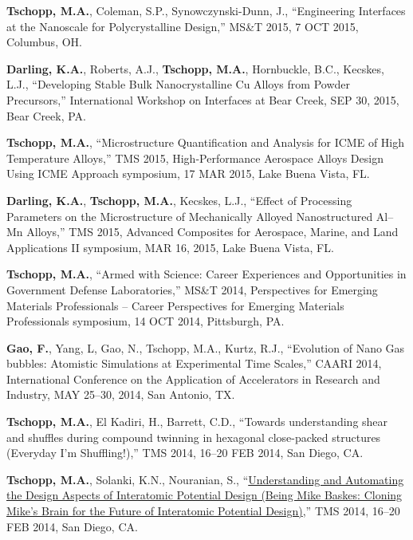 \begin{cvlist}
\item
\textbf{Tschopp, M.A.}, Coleman, S.P., Synowczynski-Dunn, J., ``Engineering Interfaces at the Nanoscale for Polycrystalline Design,'' MS\&T 2015, 7 OCT 2015, Columbus, OH.

\item
\textbf{Darling, K.A.}, Roberts, A.J., \textbf{Tschopp, M.A.}, Hornbuckle, B.C., Kecskes, L.J., ``Developing Stable Bulk Nanocrystalline Cu Alloys from Powder Precursors,'' International Workshop on Interfaces at Bear Creek, SEP 30, 2015, Bear Creek, PA.

\item
\textbf{Tschopp, M.A.}, ``Microstructure Quantification and Analysis for ICME of High Temperature Alloys,'' TMS 2015, High-Performance Aerospace Alloys Design Using ICME Approach symposium, 17 MAR 2015, Lake Buena Vista, FL.

\item
\textbf{Darling, K.A.}, \textbf{Tschopp, M.A.}, Kecskes, L.J., ``Effect of Processing Parameters on the Microstructure of Mechanically Alloyed Nanostructured Al--Mn Alloys,'' TMS 2015, Advanced Composites for Aerospace, Marine, and Land Applications II symposium, MAR 16, 2015, Lake Buena Vista, FL.

\item
\textbf{Tschopp, M.A.}, ``Armed with Science: Career Experiences and Opportunities in Government Defense Laboratories,'' MS\&T 2014, Perspectives for Emerging Materials Professionals -- Career Perspectives for Emerging Materials Professionals symposium, 14 OCT 2014, Pittsburgh, PA.

\item
\textbf{Gao, F.}, Yang, L, Gao, N., {Tschopp, M.A.}, Kurtz, R.J., ``Evolution of Nano Gas bubbles: Atomistic Simulations at Experimental Time Scales,'' CAARI 2014, International Conference on the Application of Accelerators in Research and Industry, MAY 25--30, 2014, San Antonio, TX.

\item
\textbf{Tschopp, M.A.}, El Kadiri, H., Barrett, C.D.,  ``Towards understanding shear and shuffles during compound twinning in hexagonal close-packed structures (Everyday I'm Shuffling!),'' TMS 2014, 16--20 FEB 2014, San Diego, CA.

\item
\textbf{Tschopp, M.A.}, Solanki, K.N., Nouranian, S.,  ``\href{http://dx.doi.org/10.13140/2.1.1844.8165}{Understanding and Automating the Design Aspects of Interatomic Potential Design (Being Mike Baskes: Cloning Mike's Brain for the Future of Interatomic Potential Design)},'' TMS 2014, 16--20 FEB 2014, San Diego, CA.


\end{cvlist}
